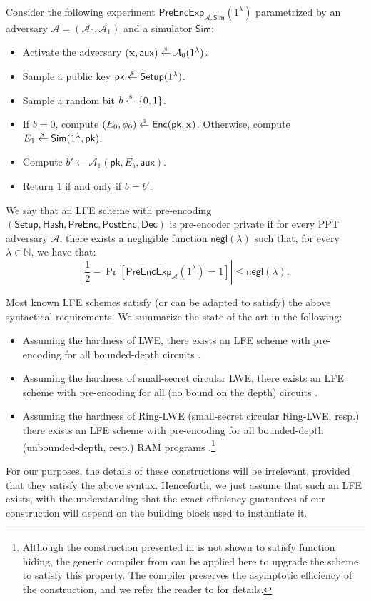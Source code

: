 \documentclass{article}
\newcommand{\getsr}{\overset{\raisebox{-1pt}{$\scriptscriptstyle \$$}}{\gets}}
\newcommand{\sample}{\getsr}
\newcommand{\Pre}{\mathsf{Pre}}
\newcommand{\Post}{\mathsf{Post}}
\newcommand{\N}{\mathbb{N}}
\newcommand{\negl}{\mathsf{negl}}
\renewcommand{\sec}{\ensuremath{\lambda}}
\newcommand{\aux}{\mathsf{aux}}
\newcommand{\Sim}{\mathsf{Sim}}
\newcommand{\Adv}{\mathcal{A}}
\newcommand{\algofont}[1]{\ensuremath{\mathsf{#1}}}
\newcommand{\Enc}{{\algofont{Enc}}}
\newcommand{\Dec}{{\algofont{Dec}}}
\newcommand{\Setup}{{\algofont{Setup}}}
\newcommand{\Hash}{{\algofont{Hash}}}
\newcommand{\pk}{{\mathsf{pk}}}
\newcommand\bbbone{1}
\begin{document}
\begin{definition}
Consider the following experiment $\mathsf{PreEncExp}_{\mathcal{A}, \Sim}(\bbbone^\sec)$ parametrized by an adversary $\mathcal{A} = (\mathcal{A}_0, \mathcal{A}_1)$ and a simulator $\Sim$:
\begin{itemize}
    \item Activate the adversary $(\mathbf{x}, \aux)\sample\Adv_0(\bbbone^\sec)$.
    \item Sample a public key $\pk\sample\Setup(\bbbone^\sec)$.
    \item Sample a random bit $b\sample\{0, 1\}$. 
    \item If $b=0$, compute $(E_0, \phi_0)\sample\Enc(\pk, \mathbf{x})$. Otherwise, compute $E_1\sample\Sim(\bbbone^\sec, \pk)$.
    \item Compute $b' \gets \Adv_1(\pk, E_b, \aux)$.
    \item Return $1$ if and only if $b =b'$.
\end{itemize}
We say that an LFE scheme with pre-encoding $(\Setup, \Hash, \Pre\Enc, \Post\Enc, \Dec)$ is pre-encoder private if for every PPT adversary $\mathcal{A}$, there exists a negligible function $\negl(\sec)$ such that, for every $\sec\in\N$, we have that:
\[
\left|\frac{1}{2} - \Pr\left[\mathsf{PreEncExp}_{\mathcal{A}}(\bbbone^\sec) = 1\right] \right|\le\negl(\sec).
\]
\end{definition}
%
Most known LFE schemes satisfy (or can be adapted to satisfy) the above syntactical requirements. We summarize the state of the art in the following:
\begin{itemize}
    \item Assuming the hardness of LWE, there exists an LFE scheme with pre-encoding for all bounded-depth circuits \cite[Appendix E]{FOCS:QuaWeeWic18}.
    \item Assuming the hardness of small-secret circular LWE, there exists an LFE scheme with pre-encoding for all (no bound on the depth) circuits \cite{FOCS:HsiLinLuo23}.
    \item Assuming the hardness of Ring-LWE (small-secret circular Ring-LWE, resp.) there exists an LFE scheme with pre-encoding for all bounded-depth (unbounded-depth, resp.) RAM programs \cite{C:DHMWW24}.\footnote{{Although the construction presented in \cite{C:DHMWW24} is not shown to satisfy function hiding, the generic compiler from \cite{FOCS:QuaWeeWic18} can be applied here to upgrade the scheme to satisfy this property. The compiler preserves the asymptotic efficiency of the construction, and we refer the reader to \cite{FOCS:QuaWeeWic18} for details.}}
\end{itemize}
For our purposes, the details of these constructions will be irrelevant, provided that they satisfy the above syntax. Henceforth, we just assume that such an LFE exists, with the understanding that the exact efficiency guarantees of our construction will depend on the building block used to instantiate it.
\end{document}
